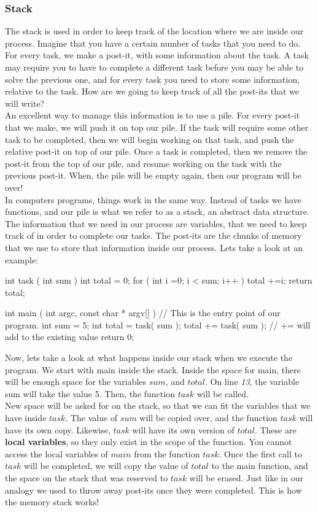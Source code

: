 \documentclass[../notebook.tex]{subfiles}
\begin{document}
\subsubsection{Stack}
The stack is used in order to keep track of the location where we are inside our process. Imagine that you have a certain number of tasks that you need to do. For every task, we make a post-it, with some information about the task. A task may require you to have to complete a different task before you may be able to solve the previous one, and for every task you need to store some information, relative to the task. How are we going to keep track of all the post-its that we will write? \\
An excellent way to manage this information is to use a pile. For every post-it that we make, we will push it on top our pile. If the task will require some other task to be completed, then we will begin working on that task, and push the relative post-it on top of our pile. Once a task is completed, then we remove the post-it from the top of our pile, and resume working on the task with the previous post-it. When, the pile will be empty again, then our program will be over! \\
In computers programs, things work in the same way. Instead of tasks we have functions, and our pile is what we refer to as a stack, an abstract data structure. The information that we need in our process are variables, that we need to keep track of in order to complete our tasks. The post-its are the chunks of memory that we use to store that information inside our process. Lets take a look at an example:
\begin{cppcode}
  int task ( int sum )
  {
    int total = 0;
    for ( int i =0; i < sum; i++ )
      total +=i; 
    return total;
  }

  int main ( int argc, const char * argv[] ) 
  { //  This is the entry point of our program.
    int sum = 5;
    int total = task( sum );
    total    += task( sum ); // += will add to the existing value
    return 0; 
  }
\end{cppcode}
Now, lets take a look at what happens inside our stack when we execute the program. We start with main inside the stack. Inside the space for main, there will be enough space for the variables $sum$, and $total$. On line \emph{13}, the variable sum will take the value 5. Then, the function $task$ will be called. \\
New space will be asked for on the stack, so that we can fit the variables that we have inside $task$. The value of $sum$ will be copied over, and the function $task$ will have its own copy. Likewise, $task$ will have its own version of $total$. These are {\bf local variables}, so they only exist in the scope of the function. You cannot access the local variables of  $main$ from the function $task$. Once the first call to $task$ will be completed, we will copy the value of $total$ to the main function, and the space on the stack that was reserved to $task$ will be erased. Just like in our analogy we used to throw away post-its once they were completed. This is how the memory stack works! \\
\end{document}
